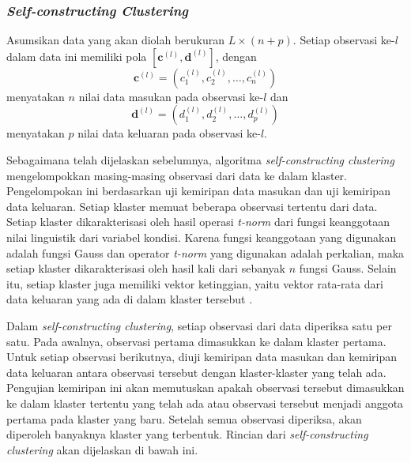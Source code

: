 \subsubsection{\emph{Self-constructing Clustering}}
\noindent Asumsikan data yang akan diolah berukuran $L\times(n+p)$. Setiap observasi ke-$l$ dalam data ini memiliki pola $[\mathbf{c}^{(l)}, \mathbf{d}^{(l)}]$, dengan
\[\mathbf{c}^{(l)} = (c_1^{(l)},c_2^{(l)},\ldots,c_n^{(l)})\]
menyatakan $n$ nilai data masukan pada observasi ke-$l$ dan
\[\mathbf{d}^{(l)} = (d_1^{(l)},d_2^{(l)},\ldots,d_p^{(l)})\]
menyatakan $p$ nilai data keluaran pada observasi ke-$l$.

\noindent Sebagaimana telah dijelaskan sebelumnya, algoritma \emph{self-constructing clustering} mengelompokkan masing-masing observasi dari data ke dalam klaster. Pengelompokan ini berdasarkan uji kemiripan data masukan dan uji kemiripan data keluaran. Setiap klaster memuat beberapa observasi tertentu dari data. Setiap klaster dikarakterisasi oleh hasil operasi \emph{t-norm} dari fungsi keanggotaan nilai linguistik dari variabel kondisi. Karena fungsi keanggotaan yang digunakan adalah fungsi Gauss dan operator \emph{t-norm} yang digunakan adalah perkalian, maka setiap klaster dikarakterisasi oleh hasil kali dari sebanyak $n$ fungsi Gauss. Selain itu, setiap klaster juga memiliki vektor ketinggian, yaitu vektor rata-rata dari data keluaran yang ada di dalam klaster tersebut \cite{yeh}.

\noindent Dalam \emph{self-constructing clustering}, setiap observasi dari data diperiksa satu per satu. Pada awalnya, observasi pertama dimasukkan ke dalam klaster pertama. Untuk setiap observasi berikutnya, diuji kemiripan data masukan dan kemiripan data keluaran antara observasi tersebut dengan klaster-klaster yang telah ada. Pengujian kemiripan ini akan memutuskan apakah observasi tersebut dimasukkan ke dalam klaster tertentu yang telah ada atau observasi tersebut menjadi anggota pertama pada klaster yang baru. Setelah semua observasi diperiksa, akan diperoleh banyaknya klaster yang terbentuk. Rincian dari \emph{self-constructing clustering} akan dijelaskan di bawah ini.

